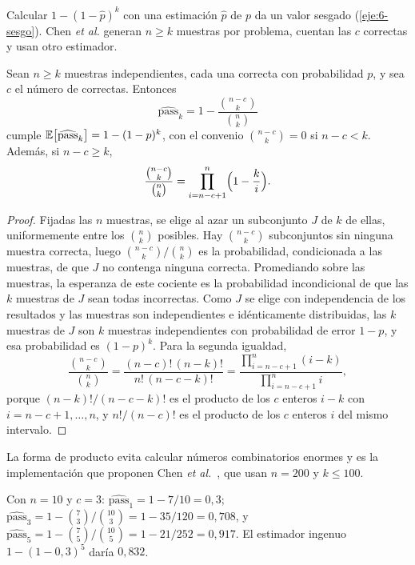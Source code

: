 Calcular $1-(1-\hat p)^{k}$ con una estimación $\hat p$ de $p$ da un valor sesgado (\cref{eje:6-sesgo}). Chen \emph{et al.} generan $n\ge k$ muestras por problema, cuentan las $c$ correctas y usan otro estimador.

\begin{proposicion}\label{prop:passk}
Sean $n\ge k$ muestras independientes, cada una correcta con probabilidad $p$, y sea $c$ el número de correctas. Entonces
\[
\widehat{\mathrm{pass}}_k=1-\frac{\binom{n-c}{k}}{\binom nk}
\]
cumple $\mathbb{E}\bigl[\widehat{\mathrm{pass}}_k\bigr]=1-(1-p)^{k}$, con el convenio $\binom{n-c}{k}=0$ si $n-c<k$. Además, si $n-c\ge k$,
\[
\frac{\binom{n-c}{k}}{\binom nk}=\prod_{i=n-c+1}^{n}\Bigl(1-\frac ki\Bigr).
\]
\end{proposicion}

\begin{proof}
Fijadas las $n$ muestras, se elige al azar un subconjunto $J$ de $k$ de ellas, uniformemente entre los $\binom nk$ posibles. Hay $\binom{n-c}{k}$ subconjuntos sin ninguna muestra correcta, luego $\binom{n-c}{k}/\binom nk$ es la probabilidad, condicionada a las muestras, de que $J$ no contenga ninguna correcta. Promediando sobre las muestras, la esperanza de este cociente es la probabilidad incondicional de que las $k$ muestras de $J$ sean todas incorrectas. Como $J$ se elige con independencia de los resultados y las muestras son independientes e idénticamente distribuidas, las $k$ muestras de $J$ son $k$ muestras independientes con probabilidad de error $1-p$, y esa probabilidad es $(1-p)^{k}$. Para la segunda igualdad,
\[
\frac{\binom{n-c}{k}}{\binom nk}=\frac{(n-c)!\,(n-k)!}{n!\,(n-c-k)!}=\frac{\prod_{i=n-c+1}^{n}(i-k)}{\prod_{i=n-c+1}^{n}i},
\]
porque $(n-k)!/(n-c-k)!$ es el producto de los $c$ enteros $i-k$ con $i=n-c+1,\dots,n$, y $n!/(n-c)!$ es el producto de los $c$ enteros $i$ del mismo intervalo.
\end{proof}

La forma de producto evita calcular números combinatorios enormes y es la implementación que proponen Chen \emph{et al.}~\cite[§2.1, fig.~3]{chen}, que usan $n=200$ y $k\le 100$.

\begin{ejemplo}\label{ej:passk}
Con $n=10$ y $c=3$: $\widehat{\mathrm{pass}}_1=1-7/10=0{,}3$; $\widehat{\mathrm{pass}}_3=1-\binom73/\binom{10}3=1-35/120=0{,}708$, y $\widehat{\mathrm{pass}}_5=1-\binom75/\binom{10}5=1-21/252=0{,}917$. El estimador ingenuo $1-(1-0{,}3)^{5}$ daría $0{,}832$.
\end{ejemplo}

